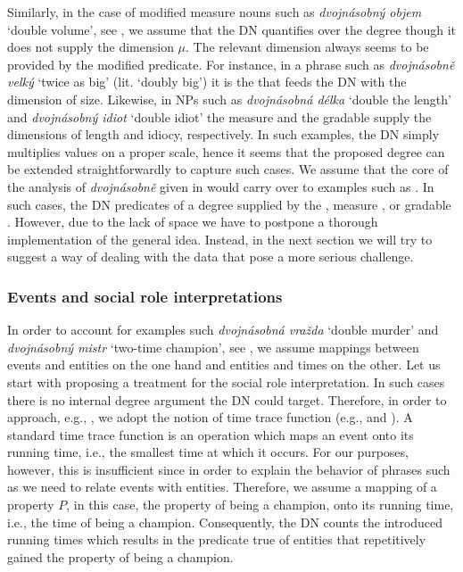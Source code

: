 \documentclass[output=paper,modfonts,hidelinks,newtxmath
\ChapterDOI{10.5281/zenodo.2545513}
]{langscibook}
\begin{document}
\noindent Similarly, in the case of modified measure nouns such as \textit{dvojnásobný objem} `double volume', see , we assume that the DN quantifies over the degree though it does not supply the dimension $\mu$. The relevant dimension always seems to be provided by the modified predicate. For instance, in a phrase such as \textit{dvojnásobně velký} `twice as big' (lit. `doubly big') it is the  that feeds the  DN with the dimension of size. Likewise, in NPs such as \textit{dvojnásobná délka} `double the length' and \textit{dvojnásobný idiot} `double idiot' the measure  and the gradable  supply the dimensions of length and idiocy, respectively. In such examples, the DN simply multiplies values on a proper scale, hence it seems that the proposed degree  can be extended straightforwardly to capture such cases. We assume that the core of the analysis of \textit{dvojnásobně} given in  would carry over to examples such as . In such cases, the DN predicates of a degree supplied by the , measure , or gradable . However, due to the lack of space we have to postpone a thorough implementation of the general idea. Instead, in the next section we will try to suggest a way of dealing with the data that pose a more serious challenge.

\subsubsection{Events and social role interpretations}\label{events-and-social-role-interpretations}

In order to account for examples such \textit{dvojnásobná vražda} `double murder' and \textit{dvojnásobný mistr} `two-time champion', see , we assume mappings between events and entities on the one hand and entities and times on the other. Let us start with proposing a treatment for the social role interpretation. In such cases there is no internal degree argument the DN could target. Therefore, in order to approach, e.g., , we adopt the notion of time trace function (e.g., \citealt{krifka_nominal_1989} and \citealt{lasersohn_plurality_1995}). A standard time trace function is an operation which maps an event onto its running time, i.e., the smallest time at which it occurs. For our purposes, however, this is insufficient since in order to explain the behavior of phrases such as  we need to relate events with entities. Therefore, we assume a mapping of a property $P$, in this case, the property of being a champion, onto its running time, i.e., the time of being a champion. Consequently, the DN counts the introduced running times which results in the predicate true of entities that repetitively gained the property of being a champion.
\end{document}
